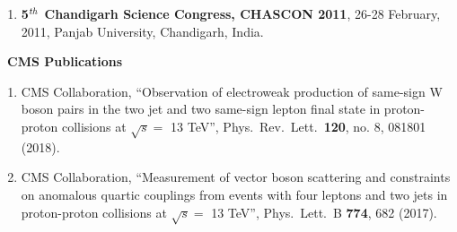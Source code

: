 \begin{itemize}
\begin{enumerate}
\item {\bf 5$^{\it th}$ Chandigarh Science Congress, CHASCON 2011}, 26-28 February, 2011, Panjab University, Chandigarh, India.
\end{enumerate}
\vspace*{3mm}
{\Large \item {\bf ~CMS Publications}}\protect\footnotemark
{}
\begin{enumerate}

\item CMS Collaboration, ``Observation of electroweak production of same-sign W boson pairs in the two jet and two same-sign lepton final state in proton-proton collisions at $\sqrt{s} = $ 13 TeV'', Phys.\ Rev.\ Lett.\  {\bf 120}, no. 8, 081801 (2018).

\item CMS Collaboration, ``Measurement of vector boson scattering and constraints on anomalous quartic couplings from events with four leptons and two jets in proton-proton collisions at $\sqrt{s}=$ 13 TeV'', Phys.\ Lett.\ B {\bf 774}, 682 (2017).


\end{enumerate}
\end{itemize}
